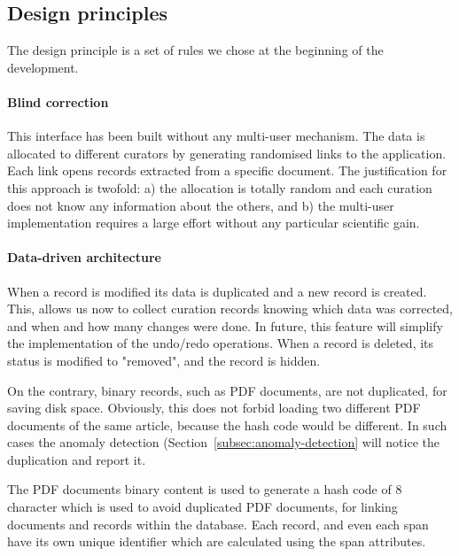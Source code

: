 \documentclass[a4paper]{article}
\begin{document}

\subsection{Design principles}
\label{subsec:design-principles}

The design principle is a set of rules we chose at the beginning of the development. 

\paragraph{Blind correction}
This interface has been built without any multi-user mechanism. 
The data is allocated to different curators by generating randomised links to the application. Each link opens records extracted from a specific document. 
The justification for this approach is twofold: a) the allocation is totally random and each curation does not know any information about the others, and b) the multi-user implementation requires a large effort without any particular scientific gain. 

\paragraph{Data-driven architecture} When a record is modified its data is duplicated and a new record is created. 
This, allows us now to collect curation records knowing which data was corrected, and when and how many changes were done. In future, this feature will simplify the implementation of the undo/redo operations. 
When a record is deleted, its status is modified to "removed", and the record is hidden. 

On the contrary, binary records, such as PDF documents, are not duplicated, for saving disk space. Obviously, this does not forbid loading two different PDF documents of the same article, because the hash code would be different. In such cases the anomaly detection (Section~\ref{subsec:anomaly-detection} will notice the duplication and report it. 

The PDF documents binary content is used to generate a hash code of 8 character which is used to avoid duplicated PDF documents, for linking documents and records within the database. Each record, and even each span have its own unique identifier which are calculated using the span attributes.
\end{document}
